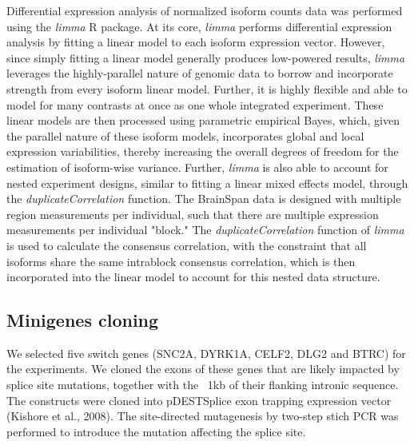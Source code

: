 Differential expression analysis of normalized isoform counts data was performed using the \textit{limma} R package. At its core, \textit{limma} performs differential expression analysis by fitting a linear model to each isoform expression vector. However, since simply fitting a linear model generally produces low-powered results, \textit{limma} leverages the highly-parallel nature of genomic data to borrow and incorporate strength from every isoform linear model. Further, it is highly flexible and able to model for many contrasts at once as one whole integrated experiment. These linear models are then processed using parametric empirical Bayes, which, given the parallel nature of these isoform models, incorporates global and local expression variabilities, thereby increasing the overall degrees of freedom for the estimation of isoform-wise variance. Further, \textit{limma} is also able to account for nested experiment designs, similar to fitting a linear mixed effects model, through the \textit{duplicateCorrelation} function. The BrainSpan data is designed with multiple region measurements per individual, such that there are multiple expression measurements per individual "block." The \textit{duplicateCorrelation} function of \textit{limma} is used to calculate the consensus correlation, with the constraint that all isoforms share the same intrablock consensus correlation, which is then incorporated into the linear model to account for this nested data structure. 

\subsection{Minigenes cloning}
We selected five switch genes (SNC2A, DYRK1A, CELF2, DLG2 and BTRC) for the experiments. We cloned the exons of these genes that are likely impacted by splice site mutations, together with the ~1kb of their flanking intronic sequence. The constructs were cloned into pDESTSplice exon trapping expression vector (Kishore et al., 2008). The site-directed mutagenesis by two-step stich PCR was performed to introduce the mutation affecting the splice site.\par


